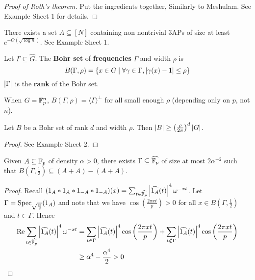 \documentclass{article}
\begin{document}
\begin{proof}[Proof of Roth's theorem]
  Put the ingredients together, Similarly to Meshulam. See Example Sheet 1 for details.
\end{proof}

\begin{nex}
  There exists a set $A \subseteq [N]$ containing non nontrivial 3APs of size at least $e^{-O(\sqrt{\log n})}$. See Example Sheet 1.
\end{nex}

\begin{ndef}
  Let $\Gamma \subseteq \hat G$. The {\bf Bohr set} of {\bf frequencies} $\Gamma$ and width $\rho$ is
  $$B(\Gamma, \rho) = \{x \in G \mid \forall \gamma \in \Gamma, \left\lvert \gamma(x) - 1\right\rvert \le \rho\}$$
  $\left\lvert \Gamma\right\rvert$ is the {\bf rank} of the Bohr set.
\end{ndef}

\begin{nex}
  When $G = \mathbb F_p^n$, $B(\Gamma, \rho) = \langle\Gamma\rangle^\perp$ for all small enough $\rho$ (depending only on $p$, not $n$).
\end{nex}

\begin{nlemma}
  Let $B$ be a Bohr set of rank $d$ and width $\rho$. Then $\left\lvert B\right\rvert \ge \left(\frac\rho{2\pi}\right)^d\left\lvert G\right\rvert$.
\end{nlemma}
\begin{proof}
  See Example Sheet 2.
\end{proof}

\newlec

\begin{nlemma}[Bogolyubov]
  Given $A \subseteq \mathbb F_p$ of density $\alpha > 0$, there exists $\Gamma \subseteq \widehat{\mathbb F_p}$ of size at most $2\alpha^{-2}$ such that $B(\Gamma, \frac 12) \subseteq (A + A) - (A + A)$.
\end{nlemma}
\begin{proof}
  Recall $(1_A \ast 1_A \ast 1_{-A} \ast 1_{-A})(x) = \sum_{t \in \widehat{\mathbb F_p}} \left\lvert \widehat{1_A}(t)\right\rvert^4 \omega^{-xt}$. Let $\Gamma = \operatorname{Spec}_{\sqrt{\frac\alpha 2}}(1_A)$ and note that we have $\cos(\frac{2\pi xt}p) > 0$ for all $x \in B(\Gamma, \frac 12)$ and $t \in \Gamma$. Hence
  \begin{align*}
    \operatorname{Re} \sum_{t \in \widehat{\mathbb F_p}} \left\lvert \widehat{1_A}(t)\right\rvert^4 \omega^{-xt}
    & = \sum_{t \in \Gamma} \left\lvert \widehat{1_A}(t)\right\rvert^4 \cos\left(\frac{2\pi xt}p\right) + \sum_{t \notin \Gamma} \left\lvert \widehat{1_A}(t)\right\rvert^4 \cos\left(\frac{2\pi xt}p\right) \\
    & \ge \alpha^4 - \frac{\alpha^4}2 > 0
  \end{align*}
\end{proof}
\end{document}

